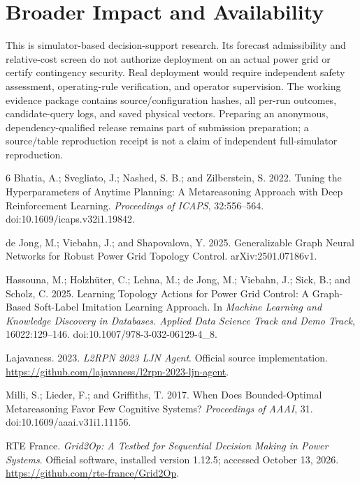\documentclass[letterpaper]{article}
\begin{document}
\section{Broader Impact and Availability}

This is simulator-based decision-support research. Its forecast admissibility and relative-cost screen do not authorize deployment on an actual power grid or certify contingency security. Real deployment would require independent safety assessment, operating-rule verification, and operator supervision. The working evidence package contains source/configuration hashes, all per-run outcomes, candidate-query logs, and saved physical vectors. Preparing an anonymous, dependency-qualified release remains part of submission preparation; a source/table reproduction receipt is not a claim of independent full-simulator reproduction.


\begin{thebibliography}{6}
Bhatia, A.; Svegliato, J.; Nashed, S. B.; and Zilberstein, S. 2022. Tuning the Hyperparameters of Anytime Planning: A Metareasoning Approach with Deep Reinforcement Learning. \emph{Proceedings of ICAPS}, 32:556--564. doi:10.1609/icaps.v32i1.19842.

de Jong, M.; Viebahn, J.; and Shapovalova, Y. 2025. Generalizable Graph Neural Networks for Robust Power Grid Topology Control. arXiv:2501.07186v1.

Hassouna, M.; Holzh\"uter, C.; Lehna, M.; de Jong, M.; Viebahn, J.; Sick, B.; and Scholz, C. 2025. Learning Topology Actions for Power Grid Control: A Graph-Based Soft-Label Imitation Learning Approach. In \emph{Machine Learning and Knowledge Discovery in Databases. Applied Data Science Track and Demo Track}, 16022:129--146. doi:10.1007/978-3-032-06129-4\_8.

Lajavaness. 2023. \emph{L2RPN 2023 LJN Agent}. Official source implementation. \url{https://github.com/lajavaness/l2rpn-2023-ljn-agent}.

Milli, S.; Lieder, F.; and Griffiths, T. 2017. When Does Bounded-Optimal Metareasoning Favor Few Cognitive Systems? \emph{Proceedings of AAAI}, 31. doi:10.1609/aaai.v31i1.11156.

RTE France. \emph{Grid2Op: A Testbed for Sequential Decision Making in Power Systems}. Official software, installed version 1.12.5; accessed October 13, 2026. \url{https://github.com/rte-france/Grid2Op}.
\end{thebibliography}
\end{document}

